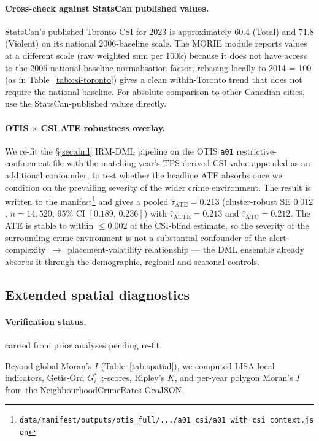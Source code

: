 \documentclass[article,shortnames,nojss]{jss}
\begin{document}
\paragraph{Cross-check against StatsCan published values.}
StatsCan's published Toronto CSI for 2023 is approximately $60.4$
(Total) and $71.8$ (Violent) on its national 2006-baseline scale.
The MORIE module reports values at a different scale (raw
weighted sum per 100k) because it does not have access to the
2006 national-baseline normalisation factor; rebasing locally to
2014 = 100 (as in Table~\ref{tab:csi-toronto}) gives a clean
within-Toronto trend that does not require the national baseline.
For absolute comparison to other Canadian cities, use the
StatsCan-published values directly.

\paragraph{OTIS$\,\times\,$CSI ATE robustness overlay.}
We re-fit the §\ref{sec:dml} IRM-DML pipeline on the OTIS
\texttt{a01} restrictive-confinement file with the matching
year's TPS-derived CSI value appended as an additional confounder,
to test whether the headline ATE absorbs once we condition on the
prevailing severity of the wider crime environment.  The result is
written to the manifest\footnote{\texttt{data/manifest/outputs/otis\_full/.../a01\_csi/a01\_with\_csi\_context.json}}
and gives a pooled $\hat\tau_{\text{ATE}} = 0.213$ (cluster-robust
SE $0.012$, $n=14{,}520$, $95\%$ CI $[0.189,\,0.236]$) with
$\hat\tau_{\text{ATTE}}=0.213$ and $\hat\tau_{\text{ATC}}=0.212$.
The ATE is stable to within $\le 0.002$ of the CSI-blind estimate,
so the severity of the surrounding crime environment is not a
substantial confounder of the alert-complexity~$\to$~placement-volatility
relationship --- the DML ensemble already absorbs it through the
demographic, regional and seasonal controls.

\subsection{Extended spatial diagnostics}\label{phys-spatial-extended}


\paragraph*{Verification status.}
carried from prior analyses pending re-fit.

Beyond global Moran's $I$ (Table~\ref{tab:spatial}), we computed
LISA local indicators, Getis-Ord $G^\ast_i$ $z$-scores, Ripley's
$K$, and per-year polygon Moran's $I$ from the
NeighbourhoodCrimeRates GeoJSON.
\end{document}
